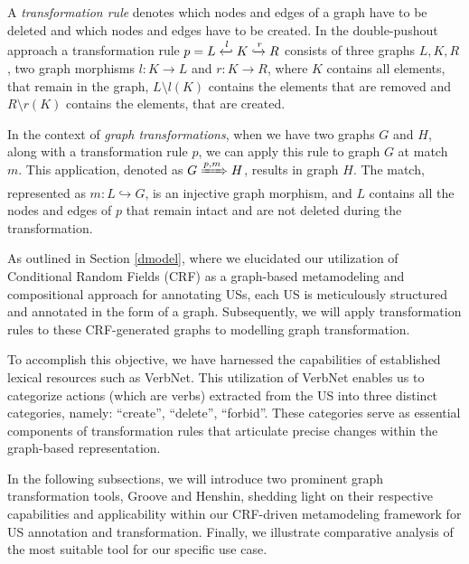 \begin{definition}
A \emph{transformation rule} denotes which nodes and edges of a graph have to be deleted and which nodes and edges have to be created.
In the double-pushout approach a transformation rule $p = L \xhookleftarrow{l} K \xhookrightarrow{r} R$ consists of three graphs $L,K,R$, two graph morphisms $l: K \to L$ and $r: K \to R$, where $K$ contains all elements, that remain in the graph, $L \setminus l(K)$ contains the elements that are removed and $R \setminus r(K)$ contains the elements, that are created.
\end{definition}
\begin{definition}
In the context of \emph{graph transformations}, when we have two graphs $G$ and $H$, along with a transformation rule $p$, we can apply this rule to graph $G$ at match $m$. This application, denoted as $G \xRightarrow{p,m} H$, results in graph $H$. The match, represented as $m : L \hookrightarrow G$, is an injective graph morphism, and $L$ contains all the nodes and edges of $p$ that remain intact and are not deleted during the transformation.
\end{definition}
As outlined in Section \ref{dmodel}, where we elucidated our utilization of Conditional Random Fields (CRF) as a graph-based metamodeling and compositional approach for annotating USs, each US is meticulously structured and annotated in the form of a graph. Subsequently, we will apply transformation rules to these CRF-generated graphs to modelling graph transformation.

To accomplish this objective, we have harnessed the capabilities of established lexical resources such as VerbNet. This utilization of VerbNet enables us to categorize actions (which are verbs) extracted from the US into three distinct categories, namely: \enquote{create}, \enquote{delete}, \enquote{forbid}. These categories serve as essential components of transformation rules that articulate precise changes within the graph-based representation. 

In the following subsections, we will introduce two prominent graph transformation tools, Groove and Henshin, shedding light on their respective capabilities and applicability within our CRF-driven metamodeling framework for US annotation and transformation. Finally, we illustrate comparative analysis of the most suitable tool for our specific use case.

